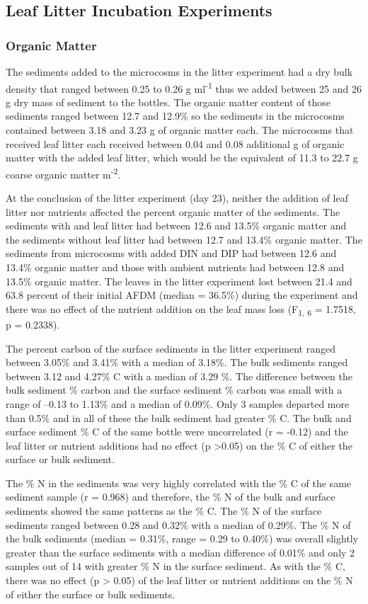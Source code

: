 \subsection{Leaf Litter Incubation Experiments}
\subsubsection{Organic Matter}
The sediments added to the microcosms in the litter experiment had a dry bulk density that ranged between 0.25 to 0.26 g ml\textsuperscript{-1} thus we added between 25 and 26 g dry mass of sediment to the bottles. The organic matter content of those sediments ranged between 12.7 and 12.9\% so the sediments in the microcosms contained between 3.18 and 3.23 g of organic matter each.  The microcosms that received leaf litter each received between 0.04 and 0.08 additional g of organic matter with the added leaf litter, which would be the equivalent of 11.3 to 22.7 g coarse organic matter m\textsuperscript{-2}. 

At the conclusion of the litter experiment (day 23), neither the addition of leaf litter nor nutrients affected the percent organic matter of the sediments. The sediments with and leaf litter had between 12.6 and 13.5\% organic matter and the sediments without leaf litter had between 12.7 and 13.4\% organic matter. The sediments from microcosms with added DIN and DIP had between 12.6 and 13.4\% organic matter and those with ambient nutrients had between 12.8 and 13.5\% organic matter. The leaves in the litter experiment lost between 21.4 and 63.8 percent of their initial AFDM (median = 36.5\%) during the experiment and there was no effect of the nutrient addition on the leaf mass loss (F\textsubscript{1, 6} = 1.7518, p = 0.2338).

The percent carbon of the surface sediments in the litter experiment ranged between 3.05\% and 3.41\% with a median of 3.18\%.  The bulk sediments ranged between 3.12 and 4.27\% C with a median of 3.29 \%.  The difference between the bulk sediment \% carbon and the surface sediment \% carbon was small with a range of --0.13 to 1.13\% and a median of 0.09\%. Only 3 samples departed more than 0.5\% and in all of these the bulk sediment had greater \% C. The bulk and surface sediment \% C of the same bottle were uncorrelated (r = -0.12) and the leaf litter or nutrient additions had no effect (p >0.05) on the \% C of either the surface or bulk sediment.

The \% N in the sediments was very highly correlated with the \% C of the same sediment sample (r = 0.968) and therefore, the \% N of the bulk and surface sediments showed the same patterns as the \% C.  The \% N of the surface sediments ranged between 0.28 and 0.32\% with a median of 0.29\%. The \% N of the bulk sediments  (median = 0.31\%, range = 0.29 to 0.40\%) was overall slightly greater than the surface sediments with a median difference of 0.01\% and only 2 samples out of 14 with greater \% N in the surface sediment.  As with the \% C, there was no effect (p > 0.05) of the leaf litter or nutrient additions on the \% N of either the surface or bulk sediments. 

